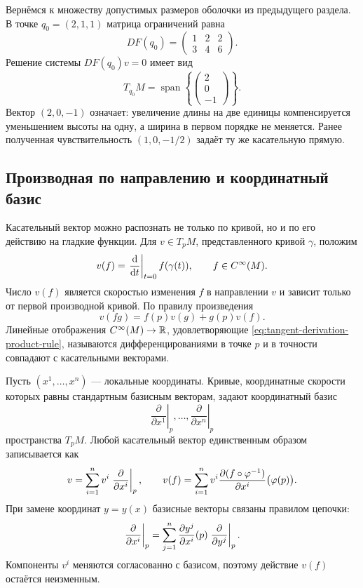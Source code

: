 Вернёмся к множеству допустимых размеров оболочки из предыдущего раздела. В точке \(q_0=(2,1,1)\) матрица ограничений равна
\[
DF(q_0)
=
\begin{pmatrix}
1&2&2\\
3&4&6
\end{pmatrix}.
\]
Решение системы \(DF(q_0)v=0\) имеет вид
\begin{equation}
\label{eq:box-design-tangent-space}
T_{q_0}M
=
\operatorname{span}\left\{
\begin{pmatrix}2\\0\\-1\end{pmatrix}
\right\}.
\end{equation}
Вектор \((2,0,-1)\) означает: увеличение длины на две единицы компенсируется уменьшением высоты на одну, а ширина в первом порядке не меняется. Ранее полученная чувствительность \((1,0,-1/2)\) задаёт ту же касательную прямую.

\subsection{Производная по направлению и координатный базис}

Касательный вектор можно распознать не только по кривой, но и по его действию на гладкие функции. Для \(v\in T_pM\), представленного кривой \(\gamma\), положим
\begin{equation}
\label{eq:tangent-vector-as-derivation}
v(f)
=
\left.\frac{\mathop{}\!\mathrm{d} }{\mathop{}\!\mathrm{d} t}\right|_{t=0}f(\gamma(t)),
\qquad
f\in C^\infty(M).
\end{equation}
Число \(v(f)\) является скоростью изменения \(f\) в направлении \(v\) и зависит только от первой производной кривой. По правилу произведения
\begin{equation}
\label{eq:tangent-derivation-product-rule}
v(fg)=f(p)v(g)+g(p)v(f).
\end{equation}
Линейные отображения \(C^\infty(M)\to\mathbb{R}\), удовлетворяющие \eqref{eq:tangent-derivation-product-rule}, называются дифференцированиями в точке \(p\) и в точности совпадают с касательными векторами.

Пусть \((x^1,\ldots,x^n)\) --- локальные координаты. Кривые, координатные скорости которых равны стандартным базисным векторам, задают координатный базис
\[
\left.\frac{\partial}{\partial x^1}\right|_p,
\ldots,
\left.\frac{\partial}{\partial x^n}\right|_p
\]
пространства \(T_pM\). Любой касательный вектор единственным образом записывается как
\begin{equation}
\label{eq:tangent-vector-coordinate-expansion}
v
=
\sum_{i=1}^n v^i
\left.\frac{\partial}{\partial x^i}\right|_p,
\qquad
v(f)
=
\sum_{i=1}^n v^i\frac{\partial (f\circ\varphi^{-1})}{\partial x^i}\bigl(\varphi(p)\bigr).
\end{equation}
При замене координат \(y=y(x)\) базисные векторы связаны правилом цепочки:
\begin{equation}
\label{eq:coordinate-basis-transformation}
\left.\frac{\partial}{\partial x^i}\right|_p
=
\sum_{j=1}^n
\frac{\partial y^j}{\partial x^i}(p)
\left.\frac{\partial}{\partial y^j}\right|_p.
\end{equation}
Компоненты \(v^i\) меняются согласованно с базисом, поэтому действие \(v(f)\) остаётся неизменным.

